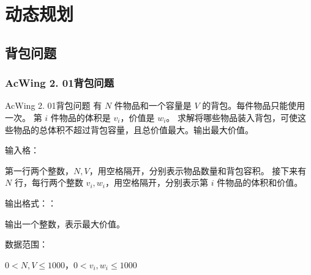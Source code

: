 \chapter{动态规划}


\section{背包问题}

\subsection{AcWing 2. 01背包问题}
\begin{titledbox}{AcWing 2. 01背包问题}
    有 $N$ 件物品和一个容量是 $V$ 的背包。每件物品只能使用一次。 第 $i$ 件物品的体积是 $v_i$，价值是 $w_i$。 求解将哪些物品装入背包，可使这些物品的总体积不超过背包容量，且总价值最大。输出最大价值。

    输入格：

    第一行两个整数，$N, V$，用空格隔开，分别表示物品数量和背包容积。 接下来有 $N$ 行，每行两个整数 $v_i, w_i$，用空格隔开，分别表示第 $i$ 件物品的体积和价值。

    输出格式：：

    输出一个整数，表示最大价值。

    数据范围：

    $0  < N, V \le 1000$，$0 < v_i, w_i \le 1000$

    \begin{inputblock}
         \\
         \\
         \\
         \\
    \end{inputblock}
    \begin{outputblock}
    \end{outputblock}
\end{titledbox}

